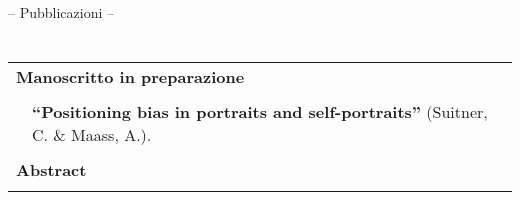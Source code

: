 \begin{center}
{\sc\Huge -- Pubblicazioni --}
\end{center}

\section*{}
\begin{tabular}{p{100pt}|p{400pt}}
\multicolumn{2}{l}{{\bf\Large Manoscritto in preparazione}}\\
\cline{1-1}
&\\[-5pt]
&{\bf ``Positioning bias in portraits and self-portraits''} (Suitner, C. \& Maass, A.).\\
\cline{2-2}
\multicolumn{2}{l}{}\\
\multicolumn{2}{l}{{\bf\large Abstract}}\\
\cline{1-1}
&\\[-5pt]

\end{tabular}
